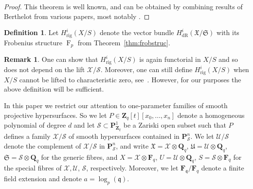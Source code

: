 \documentclass[a4paper,11pt]{article}
\numberwithin{equation}{section}
\newcommand{\ZZ}{\mathbf{Z}} %
\newcommand{\QQ}{\mathbf{Q}} %
\newcommand{\FF}{\mathbf{F}} %
\DeclareMathOperator{\Frob}{F}           %
\providecommand{\HdR}{H_{\text{dR}}}    %
\providecommand{\Hrig}{H_{\text{rig}}}  %
\theoremstyle{definition}
\newtheorem{defn}[thm]{Definition}
\newtheorem{rem}[thm]{Remark}
\begin{document}
\begin{proof}
This theorem is well known, and can be obtained by combining results of 
Berthelot from various papers, most notably \citep{Berthelot1986}.   
\end{proof}

\begin{defn}
Let $\Hrig^i(X/S)$ denote the vector bundle $\HdR^i(\mathfrak{X}/\mathfrak{S})$ 
with its Frobenius structure $\Frob_p$ from Theorem~\ref{thm:frobstruc}.
\end{defn}

\begin{rem}
One can show that $\Hrig^i(X/S)$ is again functorial in $X/S$ and so does 
not depend on the lift $\mathcal{X}/\mathcal{S}$. Moreover, one can still 
define $\Hrig^i(X/S)$ when $X/S$ cannot be lifted to characteristic zero, 
see~\citep{Berthelot1986}.  However, for our purposes the above definition 
will be sufficient.
\end{rem}

In this paper we restrict our attention to one-parameter families of smooth 
projective hypersurfaces. So we let $P \in \ZZ_q[t][x_0,\dotsc,x_n]$ denote 
a homogeneous polynomial of degree $d$ and let 
$\mathcal{S} \subset \mathbf{P}^1_{\ZZ_q}$ be a Zariski open subset such that 
$P$ defines a family $\mathcal{X}/\mathcal{S}$ of smooth hypersurfaces contained 
in $\mathbf{P}^n_{\mathcal{S}}$. 
We let $\mathcal{U}/\mathcal{S}$ 
denote the complement of $\mathcal{X}/\mathcal{S}$ in $\mathbf{P}^n_{\mathcal{S}}$,
and write $\mathfrak{X}=\mathcal{X} \otimes \QQ_q$, 
$\mathfrak{U}=\mathcal{U} \otimes \QQ_q$, $\mathfrak{S}=\mathcal{S} \otimes \QQ_q$
for the generic fibres, and $X=\mathcal{X} \otimes \FF_q$, 
$U=\mathcal{U} \otimes \QQ_q$, $S=\mathcal{S} \otimes \FF_q$ for the special 
fibres of $\mathcal{X},\mathcal{U}$, $\mathcal{S}$, respectively. Moreover, 
we let $\FF_{\mathfrak{q}}/\FF_q$ denote a finite field extension and 
denote $a=\log_p(\mathfrak{q})$.
\end{document}

